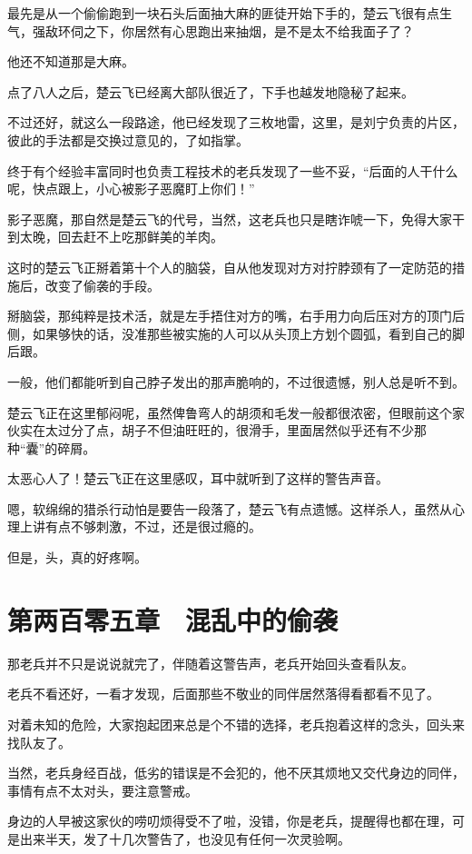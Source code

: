 最先是从一个偷偷跑到一块石头后面抽大麻的匪徒开始下手的，楚云飞很有点生气，强敌环伺之下，你居然有心思跑出来抽烟，是不是太不给我面子了？

他还不知道那是大麻。

点了八人之后，楚云飞已经离大部队很近了，下手也越发地隐秘了起来。

不过还好，就这么一段路途，他已经发现了三枚地雷，这里，是刘宁负责的片区，彼此的手法都是交换过意见的，了如指掌。

终于有个经验丰富同时也负责工程技术的老兵发现了一些不妥，“后面的人干什么呢，快点跟上，小心被影子恶魔盯上你们！”

影子恶魔，那自然是楚云飞的代号，当然，这老兵也只是瞎诈唬一下，免得大家干到太晚，回去赶不上吃那鲜美的羊肉。

这时的楚云飞正掰着第十个人的脑袋，自从他发现对方对拧脖颈有了一定防范的措施后，改变了偷袭的手段。

掰脑袋，那纯粹是技术活，就是左手捂住对方的嘴，右手用力向后压对方的顶门后侧，如果够快的话，没准那些被实施的人可以从头顶上方划个圆弧，看到自己的脚后跟。

一般，他们都能听到自己脖子发出的那声脆响的，不过很遗憾，别人总是听不到。

楚云飞正在这里郁闷呢，虽然俾鲁弯人的胡须和毛发一般都很浓密，但眼前这个家伙实在太过分了点，胡子不但油旺旺的，很滑手，里面居然似乎还有不少那种“囊”的碎屑。

太恶心人了！楚云飞正在这里感叹，耳中就听到了这样的警告声音。

嗯，软绵绵的猎杀行动怕是要告一段落了，楚云飞有点遗憾。这样杀人，虽然从心理上讲有点不够刺激，不过，还是很过瘾的。

但是，头，真的好疼啊。

\section{第两百零五章　混乱中的偷袭}

那老兵并不只是说说就完了，伴随着这警告声，老兵开始回头查看队友。

老兵不看还好，一看才发现，后面那些不敬业的同伴居然落得看都看不见了。

对着未知的危险，大家抱起团来总是个不错的选择，老兵抱着这样的念头，回头来找队友了。

当然，老兵身经百战，低劣的错误是不会犯的，他不厌其烦地又交代身边的同伴，事情有点不太对头，要注意警戒。

身边的人早被这家伙的唠叨烦得受不了啦，没错，你是老兵，提醒得也都在理，可是出来半天，发了十几次警告了，也没见有任何一次灵验啊。

